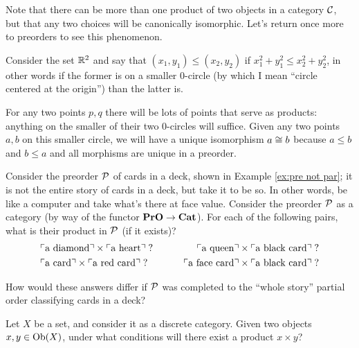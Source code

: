 \documentclass[CT4S-EN-RU]{subfiles}
\begin{document}
\begin{exampleENG}
Note that there can be more than one product of two objects in a category $\mathcal{C}$, but that any two choices will be canonically isomorphic. Let's return once more to preorders to see this phenomenon.

Consider the set ${\mathbb R}^2$ and say that $(x_1,y_1)\leq (x_2,y_2)$ if $x_1^2+y_1^2\leq x_2^2+y_2^2$, in other words if the former is on a smaller 0-circle (by which I mean “circle centered at the origin”) than the latter is. 

For any two points $p,q$ there will be lots of points that serve as products: anything on the smaller of their two 0-circles will suffice. Given any two points $a,b$ on this smaller circle, we will have a unique isomorphism $a\cong b$ because $a\leq b$ and $b\leq a$ and all morphisms are unique in a preorder.
\end{exampleENG}

\begin{exampleRUS}
\end{exampleRUS}

\begin{exerciseENG}
Consider the preorder $\mathcal{P}$ of cards in a deck, shown in Example \ref{ex:pre not par}; it is not the entire story of cards in a deck, but take it to be so. In other words, be like a computer and take what's there at face value. Consider the preorder $\mathcal{P}$ as a category (by way of the functor ${\mathbf{PrO}}\rightarrow{\mathbf{Cat}}$).
\sexc For each of the following pairs, what is their product in $\mathcal{P}$ (if it exists)?
\begin{align*}
&\textnormal{$\ulcorner$a diamond$\urcorner$}\times\textnormal{$\ulcorner$a heart$\urcorner$}\;? \hspace{.3in} &\textnormal{$\ulcorner$a queen$\urcorner$}\times\textnormal{$\ulcorner$a black card$\urcorner$}\;?\\
& \textnormal{$\ulcorner$a card$\urcorner$}\times\textnormal{$\ulcorner$a red card$\urcorner$}\;?\hspace{.3in}&\textnormal{$\ulcorner$a face card$\urcorner$}\times\textnormal{$\ulcorner$a black card$\urcorner$}\;?
\end{align*}
\item How would these answers differ if $\mathcal{P}$ was completed to the “whole story” partial order classifying cards in a deck?
\endsexc
\end{exerciseENG}

\begin{exerciseRUS}
\end{exerciseRUS}

\begin{exerciseENG}
Let $X$ be a set, and consider it as a discrete category. Given two objects $x,y\in\textnormal{Ob}(X)$, under what conditions will there exist a product $x\times y$?
\end{exerciseENG}
\end{document}
